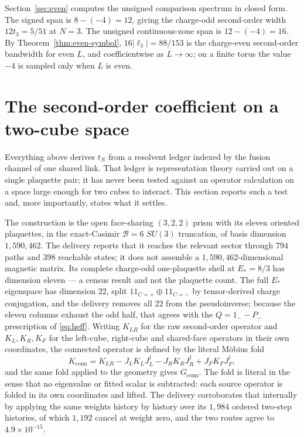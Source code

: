 \documentclass[11pt]{article}
\theoremstyle{plain}
\theoremstyle{definition}
\theoremstyle{remark}
\newcommand{\chk}[1]{}
\newcommand{\dg}{^{\dagger}}
\begin{document}
Section~\ref{sec:even} computes the unsigned comparison spectrum in closed
form. The signed span is $8-(-4)=12$, giving the charge-odd second-order width
$12t_3=5/51$ at $N=3$. The unsigned continuous-zone span is
$12-(-4)=16$. By Theorem~\ref{thm:even-symbol}, $16|\ell_3|=88/153$ is the
charge-even second-order bandwidth for even $L$, and coefficientwise as
$L\to\infty$; on a finite torus the value $-4$ is sampled only when $L$ is
even.
\chk{the two band spans ARE the two incidence spectra}

\section{The second-order coefficient on a two-cube space}
\label{sec:twocube}

Everything above derives $t_N$ from a resolvent ledger indexed by the fusion
channel of one shared link. That ledger is representation theory carried out on
a single plaquette pair; it has never been tested against an operator
calculation on a space large enough for two cubes to interact. This section
reports such a test and, more importantly, states what it settles.

The construction is the open face-sharing $(3,2,2)$ prism with its eleven
oriented plaquettes, in the exact-Casimir $\mathcal B=6$ $SU(3)$ truncation, of
basis dimension $1{,}590{,}462$. The delivery reports that it reaches the
relevant sector through $794$ paths and $398$ reachable states; it does not
assemble a $1{,}590{,}462$-dimensional magnetic matrix. Its complete
charge-odd one-plaquette shell at
$E_*=8/3$ has dimension eleven --- a census result and not the plaquette count.
The full $E_*$ eigenspace has dimension $22$, split $11_{C=+}\oplus11_{C=-}$ by
tensor-derived charge conjugation, and the delivery removes all $22$ from the
pseudoinverse; because the eleven columns exhaust the odd half, that agrees
with the $Q=1_--P_-$ prescription of \eqref{eq:heff}. Writing $K_{LR}$ for the raw second-order
operator and $K_L,K_R,K_F$ for the left-cube, right-cube and shared-face
operators in their own coordinates, the connected operator is defined by the
literal M\"obius fold
\begin{equation}\label{eq:mobius}
  K_{\mathrm{conn}}=K_{LR}-J_LK_LJ_L\dg-J_RK_RJ_R\dg+J_FK_FJ_F\dg ,
\end{equation}
and the same fold applied to the geometry gives $G_{\mathrm{conn}}$. The fold
is literal in the sense that no eigenvalue or fitted scalar is subtracted: each
source operator is folded in its own coordinates and lifted. The delivery
corroborates that internally by applying the same weights history by history
over its $1{,}984$ ordered two-step histories, of which $1{,}192$ cancel at
weight zero, and the two routes agree to $4.9\times10^{-15}$.
\end{document}
